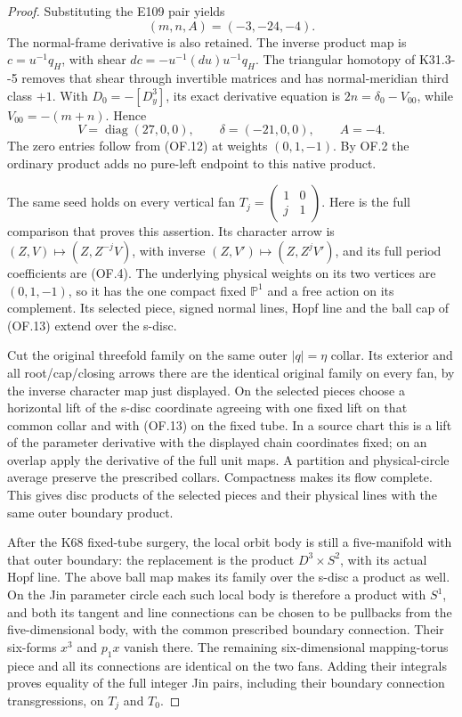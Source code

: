 \begin{proof}
Substituting the E109 pair yields
\[
                 (m,n,A)=(-3,-24,-4).                \tag{OF.14}
\]
The normal-frame derivative is also retained. The inverse
product map is \(c=u^{-1}q_H\), with shear
\(dc=-u^{-1}(du)u^{-1}q_H\). The triangular homotopy
of K31.3-\/-5 removes that shear through invertible matrices
and has normal-meridian third class \(+1\). With
\(D_0=-[D^3_y]\), its exact derivative equation is
\(2n=\delta_0-V_{00}\), while
\(V_{00}=-(m+n)\). Hence
\[
 V=\operatorname{diag}(27,0,0),\qquad
 \delta=(-21,0,0),\qquad A=-4.                      \tag{OF.15}
\]
The zero entries follow from (OF.12) at weights \((0,1,-1)\).
By OF.2 the ordinary product adds no pure-left endpoint to
this native product.

The same seed holds on every vertical fan
\(T_j=\left(\begin{smallmatrix}1&0\\j&1\end{smallmatrix}\right)\).
Here is the full comparison that proves this assertion.
Its character arrow is \((Z,V)\mapsto(Z,Z^{-j}V)\),
with inverse \((Z,V')\mapsto(Z,Z^jV')\), and its full
period coefficients are (OF.4). The underlying physical
weights on its two vertices are \((0,1,-1)\), so it has
the one compact fixed \(\mathbb P^1\) and a free action
on its complement. Its selected piece, signed normal lines,
Hopf line and the ball cap of (OF.13) extend over the s-disc.

Cut the original threefold family on the same outer
\(|q|=\eta\) collar. Its exterior and all root/cap/closing
arrows there are the identical original family on every
fan, by the inverse character map just displayed. On the
selected pieces choose a horizontal lift of the s-disc
coordinate agreeing with one fixed lift on that common
collar and with (OF.13) on the fixed tube. In a source
chart this is a lift of the parameter derivative with
the displayed chain coordinates fixed; on an overlap
apply the derivative of the full unit maps. A partition
and physical-circle average preserve the prescribed
collars. Compactness makes its flow complete. This gives
disc products of the selected pieces and their physical
lines with the same outer boundary product.

After the K68 fixed-tube surgery, the local orbit body
is still a five-manifold with that outer boundary: the
replacement is the product \(D^3\times S^2\), with its
actual Hopf line. The above ball map makes its family
over the s-disc a product as well. On the Jin parameter
circle each such local body is therefore a product
with \(S^1\), and both its tangent and line connections
can be chosen to be pullbacks from the five-dimensional
body, with the common prescribed boundary connection.
Their six-forms \(x^3\) and \(p_1x\) vanish there.
The remaining six-dimensional mapping-torus piece and
all its connections are identical on the two fans.
Adding their integrals proves equality of the full
integer Jin pairs, including their boundary connection
transgressions, on \(T_j\) and \(T_0\).


\end{proof}

